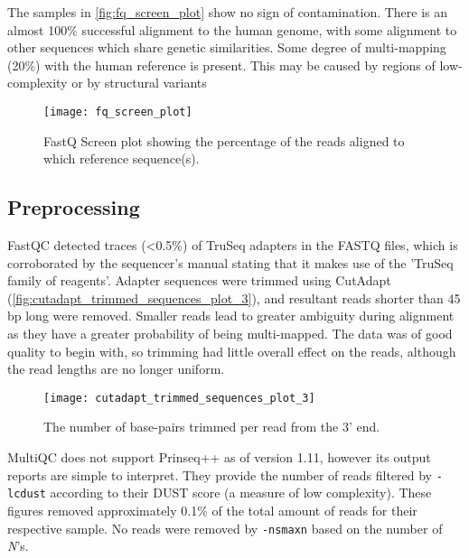 The samples in \autoref{fig:fq_screen_plot} show no sign of contamination. There is an almost 100\% successful alignment to the human genome, with some alignment to other sequences which share genetic similarities. Some degree of multi-mapping (20\%) with the human reference is present. This may be caused by regions of low-complexity or by structural variants \citep{rhoads2015pacbio}

\begin{figure}[!h]
    \centering
    \texttt{[image: fq\_screen\_plot]}
    \caption{FastQ Screen plot showing the percentage of the reads aligned to which reference sequence(s).} 
    \label{fig:fq_screen_plot}
\end{figure}


\subsection{Preprocessing}
FastQC detected traces (<0.5\%) of TruSeq adapters in the FASTQ files, which is corroborated by the sequencer's manual \citep{HiSeq2000} stating that it makes use of the 'TruSeq family of reagents'. Adapter sequences were trimmed using CutAdapt (\autoref{fig:cutadapt_trimmed_sequences_plot_3}), and resultant reads shorter than 45 bp long were removed. Smaller reads lead to greater ambiguity during alignment as they have a greater probability of being multi-mapped.  The data was of good quality to begin with, so trimming had little overall effect on the reads, although the read lengths are no longer uniform.


\begin{figure}[!h]
    \centering
    \texttt{[image: cutadapt\_trimmed\_sequences\_plot\_3]}
    \caption{The number of base-pairs trimmed per read from the 3' end.} 
    \label{fig:cutadapt_trimmed_sequences_plot_3}
\end{figure}
\newpage

MultiQC does not support Prinseq++ as of version 1.11, however its output reports are simple to interpret. They provide the number of reads filtered by \texttt{-lc\textunderscore dust} according to their DUST score (a measure of low complexity). These figures removed approximately 0.1\% of the total amount of reads for their respective sample. No reads were removed by \texttt{-ns\textunderscore max\textunderscore n} based on the number of \textit{N}'s.



